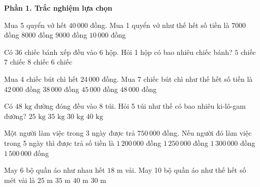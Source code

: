 \textbf{Phần 1. Trắc nghiệm lựa chọn}

\begin{ex} %
Mua 5 quyển vở hết $40\,000$ đồng. Mua 1 quyển vở như thế hết số tiền là
\choice
{$7000$ đồng}
{\True $8000$ đồng}
{$9000$ đồng}
{$10\,000$ đồng}
\end{ex}

\begin{ex} %
Có $36$ chiếc bánh xếp đều vào 6 hộp. Hỏi 1 hộp có bao nhiêu chiếc bánh?
\choice
{$5$ chiếc}
{$7$ chiếc}
{$8$ chiếc}
{\True $6$ chiếc}
\end{ex}

\begin{ex} %
Mua 4 chiếc bút chì hết $24\,000$ đồng. Mua 7 chiếc bút chì như thế hết số tiền là
\choice
{\True $42\,000$ đồng}
{$38\,000$ đồng}
{$45\,000$ đồng}
{$48\,000$ đồng}
\end{ex}

\begin{ex} %
Có $48\text{ kg}$ đường đóng đều vào 8 túi. Hỏi 5 túi như thế có bao nhiêu ki-lô-gam đường?
\choice
{$25\text{ kg}$}
{$35\text{ kg}$}
{\True $30\text{ kg}$}
{$40\text{ kg}$}
\end{ex}

\begin{ex} %
Một người làm việc trong 3 ngày được trả $750\,000$ đồng. Nếu người đó làm việc trong 5 ngày thì được trả số tiền là
\choice
{$1\,200\,000$ đồng}
{\True $1\,250\,000$ đồng}
{$1\,300\,000$ đồng}
{$1\,500\,000$ đồng}
\end{ex}

\begin{ex} %
May 6 bộ quần áo như nhau hết $18\text{ m}$ vải. May 10 bộ quần áo như thế hết số mét vải là
\choice
{$25\text{ m}$}
{$35\text{ m}$}
{$40\text{ m}$}
{\True $30\text{ m}$}
\end{ex}

